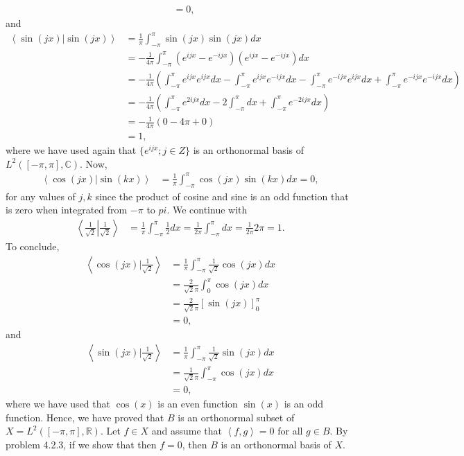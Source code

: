 \begin{questions}
\begin{solution}
\begin{align*}
&=0,
\end{align*}
and
\begin{align*}
\left<\sin(jx)|\sin(jx)\right>&=\frac{1}{\pi}\int_{-\pi}^{\pi}\sin(jx)\sin(jx)dx\\
&=-\frac{1}{4\pi}\int_{-\pi}^{\pi}\left(e^{ijx}-e^{-ijx}\right)\left(e^{ijx}-e^{-ijx}\right)dx\\
&=-\frac{1}{4\pi}\left(\int_{-\pi}^{\pi}e^{ijx}e^{ijx}dx-\int_{-\pi}^{\pi}e^{ijx}e^{-ijx}dx-\int_{-\pi}^{\pi}e^{-ijx}e^{ijx}dx+\int_{-\pi}^{\pi}e^{-ijx}e^{-ijx}dx\right)\\
&=-\frac{1}{4\pi}\left(\int_{-\pi}^{\pi}e^{2ijx}dx-2\int_{-\pi}^{\pi}dx+\int_{-\pi}^{\pi}e^{-2ijx}dx\right)\\
&=-\frac{1}{4\pi}\left(0-4\pi+0\right)\\
&=1,
\end{align*}
where we have used again that $\{e^{ijx}; j \in Z\}$ is an orthonormal basis of $L^2([-\pi,\pi],\mathbb{C})$.
Now,
\begin{align*}
\left<\cos(jx)|\sin(kx)\right>&=\frac{1}{\pi}\int_{-\pi}^{\pi}\cos(jx)\sin(kx)dx=0,
\end{align*}
for any values of $j,k$ since the product of cosine and sine is an odd function that is zero when integrated from $-\pi$ to $pi$. We continue with
\begin{align*}
\left<\left.\frac{1}{\sqrt{2}}\right|\frac{1}{\sqrt{2}}\right>&=\frac{1}{\pi}\int_{-\pi}^{\pi}\frac{1}{2}dx=\frac{1}{2\pi}\int_{-\pi}^{\pi}dx=\frac{1}{2\pi}2\pi=1.
\end{align*}
To conclude,
\begin{align*}
\left<\left.\cos(jx)\right|\frac{1}{\sqrt{2}}\right>&=\frac{1}{\pi}\int_{-\pi}^{\pi}\frac{1}{\sqrt{2}}\cos(jx)dx\\
&=\frac{2}{\sqrt{2}\pi}\int_{0}^{\pi}\cos(jx)dx\\
&=\frac{2}{\sqrt{2}\pi}\left[\sin(jx)\right]_{0}^{\pi}\\
&=0,
\end{align*}
and
\begin{align*}
\left<\left.\sin(jx)\right|\frac{1}{\sqrt{2}}\right>&=\frac{1}{\pi}\int_{-\pi}^{\pi}\frac{1}{\sqrt{2}}\sin(jx)dx\\
&=\frac{1}{\sqrt{2}\pi}\int_{-\pi}^{\pi}\cos(jx)dx\\
&=0,
\end{align*}
where we have used that $\cos(x)$ is an even function $\sin(x)$ is an odd function. Hence, we have proved that $B$ is an orthonormal subset of $X=L^2([-\pi,\pi],\mathbb{R})$. Let $f\in X$ and assume that $\left<f,g\right>=0$ for all $g\in B$. By problem 4.2.3, if we show that then $f=0$, then $B$ is an orthonormal basis of $X$.

\end{solution}
\end{questions}

